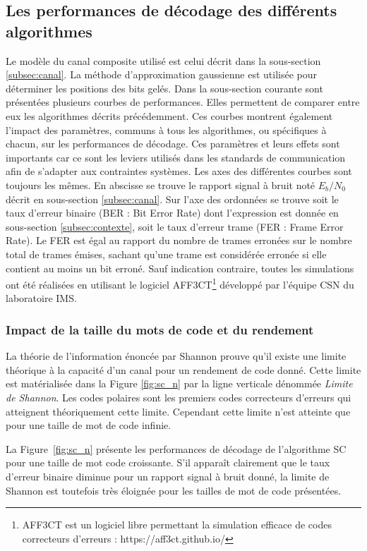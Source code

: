 \subsection{Les performances de décodage des différents algorithmes}
Le modèle du canal composite utilisé est celui décrit dans la sous-section \ref{subsec:canal}. La méthode d'approximation gaussienne est utilisée pour déterminer les positions des bits gelés. 
Dans la sous-section courante sont présentées plusieurs courbes de performances. 
Elles permettent de comparer entre eux les algorithmes décrits précédemment.
Ces courbes montrent également l'impact des paramètres, communs à tous les algorithmes, ou spécifiques à chacun, sur les performances de décodage.
Ces paramètres et leurs effets sont importants car ce sont les leviers utilisés dans les standards de communication afin de s'adapter aux contraintes systèmes.
Les axes des différentes courbes sont toujours les mêmes.
En abscisse se trouve le rapport signal à bruit noté $E_b/N_0$ décrit en sous-section \ref{subsec:canal}.
Sur l'axe des ordonnées se trouve soit le taux d'erreur binaire (BER : Bit Error Rate) dont l'expression est donnée en sous-section \ref{subsec:contexte}, soit le taux d'erreur trame (FER : Frame Error Rate). Le FER est égal au rapport du nombre de trames erronées sur le nombre total de trames émises, sachant qu'une trame est considérée erronée si elle contient au moins un bit erroné. Sauf indication contraire, toutes les simulations ont été réalisées en utilisant le logiciel AFF3CT\footnote{AFF3CT est un logiciel libre permettant la simulation efficace de codes correcteurs d'erreurs : https://aff3ct.github.io/} développé par l'équipe CSN du laboratoire IMS.
  
\subsubsection{Impact de la taille du mots de code et du rendement}

La théorie de l'information énoncée par Shannon \cite{shannon_mathematical_2001} prouve qu'il existe une limite théorique à la capacité d'un canal pour un rendement de code donné.
Cette limite est matérialisée dans la Figure \ref{fig:sc_n} par la ligne verticale dénommée \textit{Limite de Shannon}. Les codes polaires sont les premiers codes correcteurs d'erreurs qui atteignent théoriquement cette limite. Cependant cette limite n'est atteinte que pour une taille de mot de code infinie.

La Figure~\ref{fig:sc_n} présente les performances de décodage de l'algorithme SC pour une taille de mot code croissante. S'il apparaît clairement que le taux d'erreur binaire diminue pour un rapport signal à bruit donné, la limite de Shannon est toutefois très éloignée pour les tailles de mot de code présentées. 

